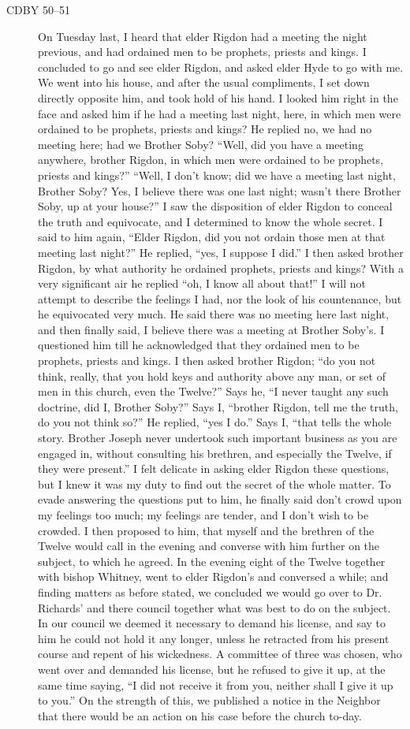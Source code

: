 \begin{description}
		\item[CDBY 50--51] On Tuesday last, I heard that elder Rigdon had a meeting the night previous, and had ordained men to be prophets, priests and kings. I concluded to go and see elder Rigdon, and asked elder Hyde to go with me. We went into his house, and after the usual compliments, I set down directly opposite him, and took hold of his hand. I looked him right in the face and asked him if he had a meeting last night, here, in which men were ordained to be prophets, priests and kings? He replied no, we had no meeting here; had we Brother Soby? ``Well, did you have a meeting anywhere, brother Rigdon, in which men were ordained to be prophets, priests and kings?'' ``Well, I don't know; did we have a meeting last night, Brother Soby? Yes, I believe there was one last night; wasn't there Brother Soby, up at your house?'' I saw the disposition of elder Rigdon to conceal the truth and equivocate, and I determined to know the whole secret. I said to him again, ``Elder Rigdon, did you not ordain those men at that meeting last night?'' He replied, ``yes, I suppose I did.'' I then asked brother Rigdon, by what authority he ordained prophets, priests and kings? With a very significant air he replied ``oh, I know all about that!'' I will not attempt to describe the feelings I had, nor the look of his countenance, but he equivocated very much. He said there was no meeting here last night, and then finally said, I believe there was a meeting at Brother Soby's. I questioned him till he acknowledged that they ordained men to be prophets, priests and kings. I then asked brother Rigdon; ``do you not think, really, that you hold keys and authority above any man, or set of men in this church, even the Twelve?'' Says he, ``I never taught any such doctrine, did I, Brother Soby?'' Says I, ``brother Rigdon, tell me the truth, do you not think so?'' He replied, ``yes I do.'' Says I, ``that tells the whole story. Brother Joseph never undertook such important business as you are engaged in, without consulting his brethren, and especially the Twelve, if they were present.'' I felt delicate in asking elder Rigdon these questions, but I knew it was my duty to find out the secret of the whole matter. To evade answering the questions put to him, he finally said don't crowd upon my feelings too much; my feelings are tender, and I don't wish to be crowded. I then proposed to him, that myself and the brethren of the Twelve would call in the evening and converse with him further on the subject, to which he agreed. In the evening eight of the Twelve together with bishop Whitney, went to elder Rigdon's and conversed a while; and finding matters as before stated, we concluded we would go over to Dr. Richards' and there council together what was best to do on the subject. In our council we deemed it necessary to demand his license, and say to him he could not hold it any longer, unless he retracted from his present course and repent of his wickedness. A committee of three was chosen, who went over and demanded his license, but he refused to give it up, at the same time saying, ``I did not receive it from you, neither shall I give it up to you.'' On the strength of this, we published a notice in the Neighbor that there would be an action on his case before the church to-day.

\end{description}
